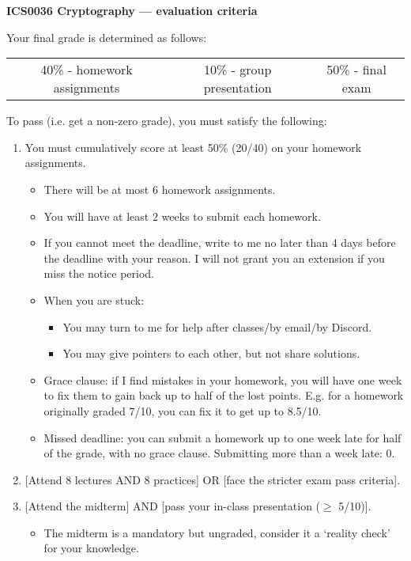 \documentclass[usegeometry,parskip=half]{scrartcl}
\begin{document}
\textbf{ICS0036 Cryptography --- evaluation criteria}

Your final grade is determined as follows:
\begin{table}[h]
  \centering
  \begin{tabular}{ccc}
    40\% - homework assignments & 10\% - group presentation & 50\% - final exam
  \end{tabular}
\end{table}

To pass (i.e. get a non-zero grade), you must satisfy the following:
\begin{enumerate}
  \item You must cumulatively score at least 50\% (20/40) on your homework assignments.
  \begin{itemize}
    \item There will be at most $6$ homework assignments.
    \item You will have at least $2$ weeks to submit each homework.
    \item If you cannot meet the deadline, write to me no later than 4 days before the deadline with your reason.
    I will not grant you an extension if you miss the notice period.
    \item When you are stuck:
    \begin{itemize}
      \item You may turn to me for help after classes/by email/by Discord.
      \item You may give pointers to each other, but not share solutions.
    \end{itemize}
    \item Grace clause: if I find mistakes in your homework, you will have one week to fix them to gain back up to half of the lost points.
    E.g. for a homework originally graded 7/10, you can fix it to get up to 8.5/10.
    \item Missed deadline: you can submit a homework up to one week late for half of the grade, with no grace clause.
    Submitting more than a week late: 0.
  \end{itemize}
  \item {[Attend 8 lectures AND 8 practices] OR [face the stricter exam pass criteria].}
  \item {[Attend the midterm] AND [pass your in-class presentation ($\ge$ 5/10)].}
  \begin{itemize}
    \item The midterm is a mandatory but ungraded, consider it a `reality check' for your knowledge.

\end{itemize}
\end{enumerate}
\end{document}
